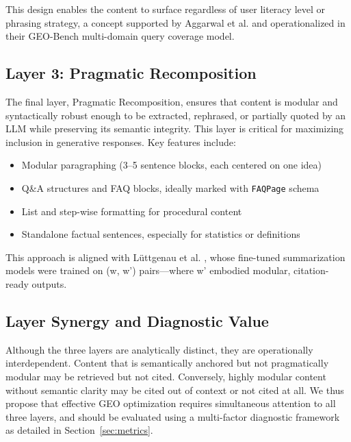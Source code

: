 This design enables the content to surface regardless of user literacy level or phrasing strategy, a concept supported by Aggarwal et al. \cite{aggarwal2024geo} and operationalized in their GEO-Bench multi-domain query coverage model.

\subsection{Layer 3: Pragmatic Recomposition}

The final layer, Pragmatic Recomposition, ensures that content is modular and syntactically robust enough to be extracted, rephrased, or partially quoted by an LLM while preserving its semantic integrity. This layer is critical for maximizing inclusion in generative responses. Key features include:
\begin{itemize}
  \item Modular paragraphing (3--5 sentence blocks, each centered on one idea)
  \item Q\&A structures and FAQ blocks, ideally marked with \texttt{FAQPage} schema
  \item List and step-wise formatting for procedural content
  \item Standalone factual sentences, especially for statistics or definitions
\end{itemize}

This approach is aligned with L\"uttgenau et al. \cite{luttgenau2025beyondseo}, whose fine-tuned summarization models were trained on (w, w') pairs---where w' embodied modular, citation-ready outputs.

\subsection{Layer Synergy and Diagnostic Value}

Although the three layers are analytically distinct, they are operationally interdependent. Content that is semantically anchored but not pragmatically modular may be retrieved but not cited. Conversely, highly modular content without semantic clarity may be cited out of context or not cited at all. We thus propose that effective GEO optimization requires simultaneous attention to all three layers, and should be evaluated using a multi-factor diagnostic framework as detailed in Section~\ref{sec:metrics}.
